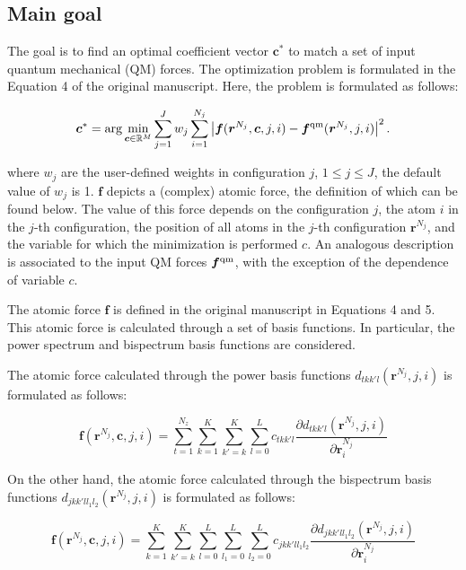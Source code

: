 \documentclass[12pt]{article}
\begin{document}
\subsection{Main goal}

The goal is to find an optimal coefficient vector $\bm c^*$ to match a set of input quantum mechanical (QM) forces. The optimization problem is formulated in the Equation 4 of the original manuscript. Here, the problem is formulated as follows:

\begin{equation}
\bm c^* = \arg \min_{\bm c \in \mathbb{R}^M } \sum_{j=1}^J w_j \sum_{i=1}^{N_j}  \left|\bm f(\bm {r}^{N_j}, \bm c, j, i) - \bm f^{\rm qm}(\bm r^{N_j}, j, i) \right|^2.
\label{eq:min1}
\end{equation}

where $w_j$ are the user-defined weights in configuration $j$, $1 \le j \le J$, the default value of $w_j$ is 1. $\bm f$  depicts a (complex) atomic force, the definition of which can be found below. The value of this force depends on the configuration $j$, the atom $i$ in the $j$-th configuration, the position of all atoms in the $j$-th configuration $\bm {r}^{N_j}$, and the variable for which the minimization is performed $c$. An analogous description is associated to the input QM forces $\bm f^{\rm qm}$, with the exception of the dependence of variable $c$.

The atomic force $\bm f$ is defined in the original manuscript in Equations 4 and 5. This atomic force is calculated through a set of basis functions. In particular, the power spectrum  and bispectrum basis functions are considered.

The atomic force calculated through the power basis functions $d_{tkk'l}(\bm r^{N_j}, j, i)$ is formulated as follows:

\begin{equation}
    \bm f(\bm {r}^{N_j}, \bm c, j, i) = 
    \sum_{t=1}^{N_z}
    \sum_{k=1}^K
    \sum_{k'=k}^{K}
    \sum_{l=0}^L
    c_{tkk'l}
    \frac{\partial d_{tkk'l}(\bm r^{N_j}, j, i)}{\partial \bm r^{N_j}_i}
    \label{eq:force}
\end{equation}


On the other hand, the atomic force calculated through the bispectrum basis functions $d_{jkk'l{l_1}{l_2}}(\bm r^{N_j}, j, i)$ is formulated as follows:

\begin{equation}
    \bm f(\bm {r}^{N_j}, \bm c, j, i) = 
    \sum_{k=1}^K
    \sum_{k'=k}^{K}
    \sum_{l=0}^L
    \sum_{l_1=0}^L
    \sum_{l_2=0}^L
    c_{jkk'l{l_1}{l_2}}
    \frac{\partial d_{jkk'l{l_1}{l_2}}(\bm r^{N_j}, j, i)}{\partial \bm r^{N_j}_i}
    \label{eq:force}
\end{equation}
\end{document}
